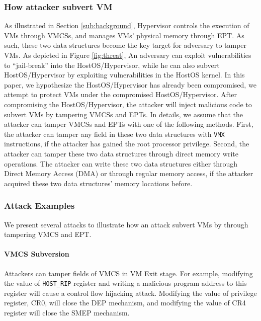 
\subsubsection{How attacker subvert VM}
As illustrated in Section \ref{sub:background}, Hypervisor controls the execution of VMs through VMCSs, and manages VMs' physical memory through EPT. As such, these two data structures become the key target for adversary to tamper VMs. 
As depicted in Figure \ref{fig:threat}, 
An adversary can exploit vulnerabilities to ``jail-break'' into the HostOS/Hypervisor, while he can also subvert HostOS/Hypervisor by exploiting vulnerabilities in the HostOS kernel.
In this paper, we hypothesize the HostOS/Hypervisor has already been compromised, we attempt to protect VMs under the compromised HostOS/Hypervisor. 
After compromising the HostOS/Hypervisor, the attacker will inject malicious code to subvert VMs by tampering VMCSs and EPTs.
In details, we assume that the attacker can tamper VMCSs and EPTs with one of the following methods. First, the attacker can tamper any field in these two data structures with \verb|VMX| instructions, if the attacker has gained the root processor privilege. Second, the attacker can tamper these two data structures through direct memory write operations. The attacker can write these two data structures either through Direct Memory Access (DMA) or through regular memory access, if the attacker acquired these two data structures' memory locations before.  


\subsubsection{Attack Examples}
We present several attacks to illustrate how an attack subvert VMs by through tampering VMCS and EPT.

\paragraph{VMCS Subversion}
Attackers can tamper fields of VMCS in VM Exit stage. For example, modifying the value of \verb|HOST_RIP| register and writing a malicious program address to this register will cause a control flow hijacking attack. Modifying the value of privilege register, CR0, will close the DEP mechanism, and modifying the value of CR4 register will close the SMEP mechanism.



